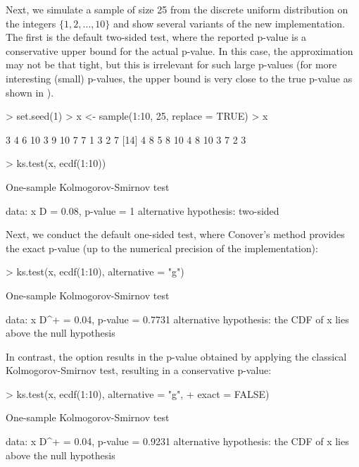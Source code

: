 Next, we simulate a sample of size 25 from the discrete uniform distribution on
the integers $\{1, 2, \ldots, 10\}$ and show several variants of the
new  implementation.  The first is the default two-sided test,
where the reported p-value is a conservative upper bound for the actual
p-value.  In this case, the approximation may not be that tight, but this is
irrelevant for such large p-values (for more interesting (small) p-values, the
upper bound is very close to the true p-value as shown in \cite{Conover1972}).
\begin{Schunk}
\begin{Sinput}
> set.seed(1)
> x <- sample(1:10, 25, replace = TRUE)
> x
\end{Sinput}
\begin{Soutput}
 [1]  3  4  6 10  3  9 10  7  7  1  3  2  7
[14]  4  8  5  8 10  4  8 10  3  7  2  3
\end{Soutput}
\begin{Sinput}
> ks.test(x, ecdf(1:10))
\end{Sinput}
\begin{Soutput}
	One-sample Kolmogorov-Smirnov test

data:  x 
D = 0.08, p-value = 1
alternative hypothesis: two-sided 
\end{Soutput}
\end{Schunk}
Next, we conduct the default one-sided test, where Conover's method
provides the exact p-value (up to the numerical precision of the
implementation):
\begin{Schunk}
\begin{Sinput}
> ks.test(x, ecdf(1:10), alternative = "g")
\end{Sinput}
\begin{Soutput}
	One-sample Kolmogorov-Smirnov test

data:  x 
D^+ = 0.04, p-value = 0.7731
alternative hypothesis:
the CDF of x lies above the null hypothesis 
\end{Soutput}
\end{Schunk}
In contrast, the option  results in the
p-value obtained by applying the classical Kolmogorov-Smirnov
test, resulting in a conservative p-value:
\begin{Schunk}
\begin{Sinput}
> ks.test(x, ecdf(1:10), alternative = "g", 
+         exact = FALSE)
\end{Sinput}
\begin{Soutput}
	One-sample Kolmogorov-Smirnov test

data:  x 
D^+ = 0.04, p-value = 0.9231
alternative hypothesis:
the CDF of x lies above the null hypothesis 
\end{Soutput}
\end{Schunk}
